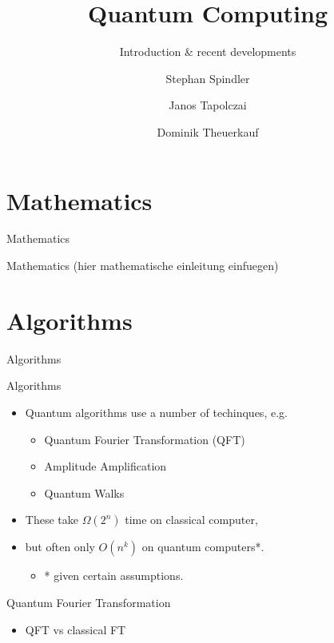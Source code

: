 \documentclass{beamer}
\title{Quantum Computing}
\subtitle{Introduction \& recent developments}
\author{Stephan Spindler \and Janos Tapolczai \and Dominik Theuerkauf}
\newcommand{\chapterframe}[1]{\begin{frame}\centering\huge{#1}\end{frame}}
\begin{document}
\begin{frame}
\titlepage
\end{frame}


\section{Mathematics}
\chapterframe{Mathematics}

\begin{frame}{Mathematics}
(hier mathematische einleitung einfuegen)
\end{frame}

\section{Algorithms}
\chapterframe{Algorithms}

\begin{frame}{Algorithms}
	\begin{itemize}
		\item Quantum algorithms use a number of techinques, e.g.
			\begin{itemize}
				\item Quantum Fourier Transformation (QFT)
				\item Amplitude Amplification
				\item Quantum Walks
			\end{itemize}
		\item These take $\Omega(2^n)$ time on classical computer,
		\item but often only $O(n^k)$ on quantum computers*.
			\begin{itemize}
				\item * given certain assumptions.
			\end{itemize}
	\end{itemize}
\end{frame}

\begin{frame}{Quantum Fourier Transformation}
	\begin{itemize}
		\item QFT vs classical FT
	\end{itemize}
\end{frame}
\end{document}
